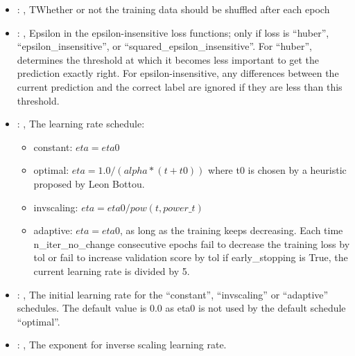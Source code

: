 \begin{itemize}
    \item {}: , 
      TWhether or not the training data should be shuffled after each epoch

    \item {}: , 
      Epsilon in the epsilon-insensitive loss functions; only if loss is ``huber'',
      ``epsilon\_insensitive'', or
      ``squared\_epsilon\_insensitive''. For ``huber'', determines the threshold at which it becomes
      less important to get the                                                  prediction exactly
      right. For epsilon-insensitive, any differences between the current prediction and the correct
      label                                                  are ignored if they are less than this
      threshold.

    \item {}: , 
      The learning rate schedule:                                                  \begin{itemize}
      \item constant: $eta = eta0$                                                   \item optimal:
      $eta = 1.0 / (alpha * (t + t0))$ where t0 is chosen by a heuristic proposed by Leon Bottou.
      \item invscaling: $eta = eta0 / pow(t, power\_t)$
      \item adaptive: $eta = eta0$, as long as the training keeps decreasing. Each time
      n\_iter\_no\_change consecutive epochs fail
      to decrease the training loss by tol or fail to increase validation score by tol if
      early\_stopping is True, the current
      learning rate is divided by 5.                                                  \end{itemize}

    \item {}: , 
      The initial learning rate for the ``constant'', ``invscaling'' or ``adaptive'' schedules. The
      default value is 0.0                                                  as eta0 is not used by
      the default schedule ``optimal''.

    \item {}: , 
      The exponent for inverse scaling learning rate.


\end{itemize}
